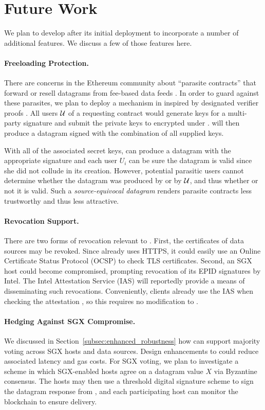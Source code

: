\section{Future Work}
\label{sec:future-work}

We plan to develop \tc after its initial deployment to incorporate a number of additional features.
We discuss a few of those features here.

\paragraph{Freeloading Protection.}
There are concerns in the Ethereum community about ``parasite contracts'' that forward or resell datagrams from fee-based data feeds \cite{parasite}.
In order to guard against these parasites, we plan to deploy a mechanism in \tc inspired by designated verifier proofs \cite{JakobssonSI1996}.
All users ${\cal U}$ of a requesting contract would generate keys for a multi-party signature and submit the private keys to \tcont encrypted under \pkTC.
\tc will then produce a datagram signed with the combination of all supplied keys.

With all of the associated secret keys, \tcont can produce a datagram with the appropriate signature and each user $U_i$ can be sure the datagram is valid since she did not collude in its creation.
However, potential parasitic users cannot determine whether the datagram was produced by \tcont or by ${\cal U}$, and thus whether or not it is valid.
Such a \emph{source-equivocal datagram} renders parasite contracts less trustworthy and thus less attractive.

\paragraph{Revocation Support.}
There are two forms of revocation relevant to \tc.
First, the certificates of data sources may be revoked.
Since \tc already uses HTTPS, it could easily use an Online Certificate Status Protocol (OCSP) to check TLS certificates.
Second, an SGX host could become compromised, prompting revocation of its EPID signatures by Intel.
The Intel Attestation Service (IAS) will reportedly provide a means of disseminating such revocations.
Conveniently, clients already use the IAS when checking the attestation \sigatt, so this requires no modification to \tc.

\paragraph{Hedging Against SGX Compromise.}
We discussed in Section~\ref{subsec:enhanced_robustness} how \tc can support majority voting across SGX hosts and data sources.
Design enhancements to \tc could reduce associated latency and gas costs.
For SGX voting, we plan to investigate a scheme in which SGX-enabled \tc hosts agree on a datagram value $X$ via Byzantine consensus.
The hosts may then use a threshold digital signature scheme to sign the datagram response from \tcadd,
and each participating host can monitor the blockchain to ensure delivery.


